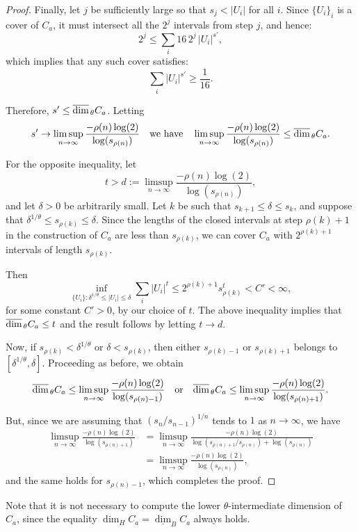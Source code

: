 \documentclass[11pt,reqno,bookmarksnumbered,raiselinks,breaklinks,colorlinks,plainpages]{amsart}
\newcommand\uda{\overline{\mbox{\rm dim}}_{\,\theta}} %
\begin{document}
\begin{proof}
Finally, let $j$ be sufficiently large so that $s_j < |U_i|$ for all $i$. Since $\{U_i\}_i$ is a cover of $C_a$, it must intersect all the $2^j$ intervals from step $j$, and hence:
\[
2^j \leq \sum_i 16 \, 2^j \, |U_i|^{s'},
\]
which implies that any such cover satisfies:
\[
\sum_i |U_i|^{s'} \geq \frac{1}{16}.
\]

Therefore, $s' \leq \uda C_a$. Letting 
\[
s' \to \limsup_{n \to \infty} \frac{-\rho(n)\log(2)}{\log(s_{\rho(n)})}
\quad \text{we have} \quad \limsup_{n \to \infty} \frac{-\rho(n)\log(2)}{\log(s_{\rho(n)})} \leq \uda C_a.
\]


For the opposite inequality, let  
\[
t > d := \limsup_{n \to \infty} \frac{-\rho(n)\log(2)}{\log(s_{\rho(n)})},
\]
and let \( \delta > 0 \) be arbitrarily small. Let \( k \) be such that \( s_{k+1} \leq \delta \leq s_k \), and suppose that \( \delta^{1/\theta} \leq s_{\rho(k)} \leq \delta \). Since the lengths of the closed intervals at step \( \rho(k)+1 \) in the construction of \( C_a \) are less than \( s_{\rho(k)} \), we can cover \( C_a \) with \( 2^{\rho(k)+1} \) intervals of length \( s_{\rho(k)} \).  

Then  
\[
\inf_{\{U_i\} : \delta^{1/\theta} \leq |U_i| \leq \delta} \sum_i |U_i|^t \leq 2^{\rho(k)+1} s_{\rho(k)}^t < C' < \infty,
\]
for some constant \( C' > 0 \), by our choice of \( t \). The above inequality implies that \( \uda C_a \leq t \) and the result follows by letting \( t \to d \).
 

Now, if \( s_{\rho(k)} < \delta^{1/\theta} \) or \( \delta < s_{\rho(k)} \), then either \( s_{\rho(k)-1} \) or \( s_{\rho(k)+1} \) belongs to \( [\delta^{1/\theta}, \delta] \). Proceeding as before, we obtain  
\[
\uda C_a \leq \limsup_{n \to \infty} \frac{-\rho(n)\log(2)}{\log(s_{\rho(n)-1})}
\quad \text{or} \quad
\uda C_a \leq \limsup_{n \to \infty} \frac{-\rho(n)\log(2)}{\log(s_{\rho(n)+1})}.
\]  

But, since we are assuming that \( (s_n / s_{n-1})^{1/n} \) tends to \( 1 \) as \( n \to \infty \), we have  
\begin{align*}
\limsup_{n \to \infty} \frac{-\rho(n)\log(2)}{\log(s_{\rho(n)+1})}  
&= \limsup_{n \to \infty} \frac{-\rho(n)\log(2)}{\log(s_{\rho(n)+1} / s_{\rho(n)}) + \log(s_{\rho(n)})}  
\\ &= \limsup_{n \to \infty} \frac{-\rho(n)\log(2)}{\log(s_{\rho(n)})},
\end{align*}
and the same holds for \( s_{\rho(n)-1} \), which completes the proof.
\end{proof}
Note that it is not necessary to compute the lower \( \theta \)-intermediate dimension of \( C_a \), since the equality \( \dim_H C_a = \underline{\dim}_B C_a \) always holds.
\end{document}
